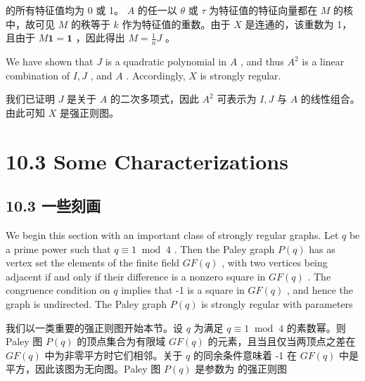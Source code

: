\documentclass[10pt]{article}
\begin{document}
\begin{tcolorbox}\relax
的所有特征值均为 0 或 1。 \(A\) 的任一以 \(\theta\) 或 \(\tau\) 为特征值的特征向量都在 \(M\) 的核中，故可见 \(M\) 的秩等于 \(k\) 作为特征值的重数。由于 \(X\) 是连通的，该重数为 1，且由于 \(M\mathbf{1} = \mathbf{1}\) ，因此得出 \(M = \frac{1}{n}J\) 。
\end{tcolorbox}

We have shown that \(J\) is a quadratic polynomial in \(A\) , and thus \({A}^{2}\) is a linear combination of \(I,J\) , and \(A\) . Accordingly, \(X\) is strongly regular.

\begin{tcolorbox}\relax
我们已证明 \(J\) 是关于 \(A\) 的二次多项式，因此 \({A}^{2}\) 可表示为 \(I,J\) 与 \(A\) 的线性组合。由此可知 \(X\) 是强正则图。
\end{tcolorbox}

\section*{10.3 Some Characterizations}

\begin{tcolorbox}\relax
\section*{10.3 一些刻画}
\end{tcolorbox}

We begin this section with an important class of strongly regular graphs. Let \(q\) be a prime power such that \(q \equiv  1{\;\operatorname{mod}\;4}\) . Then the Paley graph \(P\left( q\right)\) has as vertex set the elements of the finite field \({GF}\left( q\right)\) , with two vertices being adjacent if and only if their difference is a nonzero square in \({GF}\left( q\right)\) . The congruence condition on \(q\) implies that -1 is a square in \({GF}\left( q\right)\) , and hence the graph is undirected. The Paley graph \(P\left( q\right)\) is strongly regular with parameters

\begin{tcolorbox}\relax
我们以一类重要的强正则图开始本节。设 \(q\) 为满足 \(q \equiv  1{\;\operatorname{mod}\;4}\) 的素数幂。则 Paley 图 \(P\left( q\right)\) 的顶点集合为有限域 \({GF}\left( q\right)\) 的元素，且当且仅当两顶点之差在 \({GF}\left( q\right)\) 中为非零平方时它们相邻。关于 \(q\) 的同余条件意味着 -1 在 \({GF}\left( q\right)\) 中是平方，因此该图为无向图。Paley 图 \(P\left( q\right)\) 是参数为 的强正则图
\end{tcolorbox}
\end{document}
